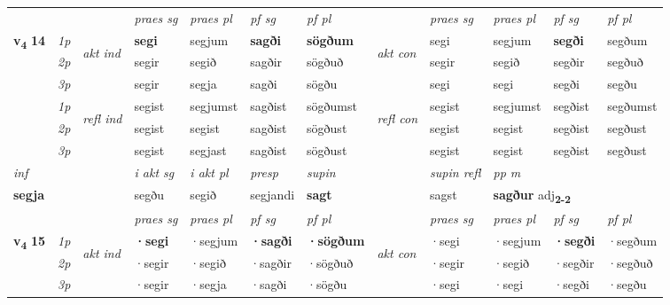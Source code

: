 \begin{longtable}[l]{X>{\footnotesize\itshape}llXXXXlXXXX}
 & &   & \textit{praes sg}  & \textit{praes pl}    & \textit{ pf sg} & \textit{pf pl} & & \textit{praes sg}  & \textit{praes pl}    & \textit{pf sg} & \textit{pf pl }  \\ \cmidrule{4-7} \cmidrule{9-12}
 \multirow{2}{*}{{{\textbf{v{\textsubscript{4}}} \Large{\textbf{14}}}}}  & 1p & \multirow{3}{*}{\begin{turn}{90}\textit{akt ind}\end{turn}} & \textbf{segi} & segjum & \textbf{sagði} & \textbf{sögðum} & \multirow{3}{*}{\begin{turn}{90}\textit{akt con}\end{turn}} &segi & segjum & \textbf{segði} & segðum\\*
 & 2p &  &  segir  & segið & sagðir & sögðuð & & segir & segið & segðir & segðuð \\*
 & 3p &  & segir & segja & sagði & sögðu & & segi & segi& segði & segðu \\*
\cmidrule{4-7} \cmidrule{9-12}
 & 1p & \multirow{3}{*}{\begin{turn}{90}\textit{refl ind}\end{turn}}  & segist & segjumst & sagðist & sögðumst & \multirow{3}{*}{\begin{turn}{90}\textit{refl con}\end{turn}}  &segist & segjumst & segðist & segðumst \\*
 & 2p &  & segist & segist & sagðist & sögðust & &segist & segist & segðist & segðust \\*
 & 3p  & & segist & segjast & sagðist & sögðust & & segist & segist& segðist & segðust \\*
\cmidrule{4-7} \cmidrule{9-12}

   {\textit{inf}} & &  & \textit{i akt sg} & \textit{i akt pl}   & \textit{presp} & \textit{supin} && \textit{supin refl} & \textit{pp m} \\*
  {\textbf{segja}} & && segðu  & segið   & segjandi &  \textbf{sagt} && sagst & \multicolumn{2}{l}{\textbf{sagður} adj\textbf{\textsubscript{2-2}}} \\*

\midrule

 & &   & \textit{praes sg}  & \textit{praes pl}    & \textit{ pf sg} & \textit{pf pl} & & \textit{praes sg}  & \textit{praes pl}    & \textit{pf sg} & \textit{pf pl }  \\ \cmidrule{4-7} \cmidrule{9-12}
 \multirow{2}{*}{{{\textbf{v{\textsubscript{4}}} \Large{\textbf{15}}}}}  & 1p & \multirow{3}{*}{\begin{turn}{90}\textit{akt ind}\end{turn}} & \textbf{·segi} & ·segjum & \textbf{·sagði} & \textbf{·sögðum} & \multirow{3}{*}{\begin{turn}{90}\textit{akt con}\end{turn}} &·segi & ·segjum & \textbf{·segði} & ·segðum\\*
 & 2p &  &  ·segir  & ·segið & ·sagðir & ·sögðuð & & ·segir & ·segið & ·segðir & ·segðuð \\*
 & 3p &  & ·segir & ·segja & ·sagði & ·sögðu & & ·segi & ·segi& ·segði & ·segðu \\*
\cmidrule{4-7} \cmidrule{9-12}


\end{longtable}
